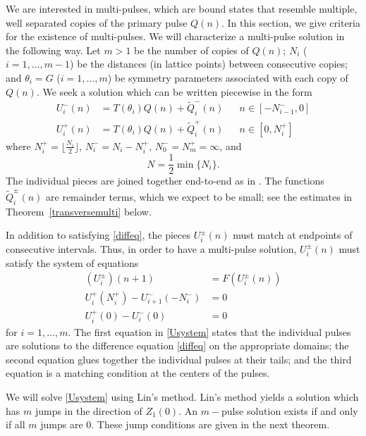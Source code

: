 \documentclass[12pt]{article}
\begin{document}
We are interested in multi-pulses, which are bound states that resemble multiple, well separated copies of the primary pulse $Q(n)$. In this section, we give criteria for the existence of multi-pulses. We will characterize a multi-pulse solution in the following way. Let $m > 1$ be the number of copies of $Q(n)$; $N_i$ ($i = 1, \dots, m-1$) be the distances (in lattice points) between consecutive copies; and $\theta_i = G$ ($i = 1, \dots, m$) be symmetry parameters associated with each copy of $Q(n)$. We seek a solution which can be written piecewise in the form 
\begin{equation}\label{Upiecewise}
\begin{aligned}
U_i^-(n) &= T(\theta_i) Q(n) + \tilde{Q}_i^-(n) && n \in [-N_{i-1}^-, 0] \\
U_i^+(n) &= T(\theta_i) Q(n) + \tilde{Q}_i^+(n) && n \in [0, N_i^+]
\end{aligned}
\end{equation}
where $N_i^+ = \lfloor \frac{N_i}{2} \rfloor$, $N_i^- = N_i - N_i^+$, $N_0^- = N_m^+ = \infty$, and
\begin{equation}\label{defN}
N = \frac{1}{2} \min\{ N_i \}.
\end{equation}
The individual pieces are joined together end-to-end as in \cite{Sandstede1998}. The functions $\tilde{Q}_i^\pm(n)$ are remainder terms, which we expect to be small; see the estimates in Theorem~\ref{transversemulti} below.

In addition to satisfying \eqref{diffeq}, the pieces $U_i^\pm(n)$ must match at endpoints of consecutive intervals. Thus, in order to have a multi-pulse solution, $U_i^\pm(n)$ must satisfy the system of equations
\begin{equation}\label{Usystem}
\begin{aligned}
(U_i^\pm)(n+1) &= F(U_i^\pm(n))  \\
U_i^+(N_i^+) - U_{i+1}^-(-N_i^-) &= 0 \\
U_i^+(0) - U_i^-(0) &= 0
\end{aligned}
\end{equation}
for $i = 1, \dots, m$. The first equation in \eqref{Usystem} states that the individual pulses are solutions to the difference equation \eqref{diffeq} on the appropriate domains; the second equation glues together the individual pulses at their tails; and the third equation is a matching condition at the centers of the pulses.

We will solve \eqref{Usystem} using Lin's method. Lin's method yields a solution which has $m$ jumps in the direction of $Z_1(0)$. An $m-$pulse solution exists if and only if all $m$ jumps are 0. These jump conditions are given in the next theorem.
\end{document}
